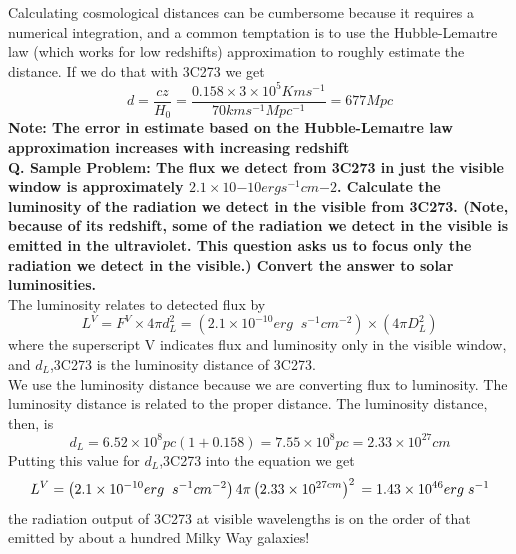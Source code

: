 \documentclass[10pt]{report}
\newcommand{\tbf}[1]{\textbf{#1}}
\newcommand{\cc}[1]{\left({#1}\right)}
\begin{document}
Calculating cosmological distances can be cumbersome because it requires a numerical integration, and a common temptation is to use the Hubble-Lemaıtre law (which works for low redshifts) approximation to roughly estimate the distance. If we do that with 3C273 we get 
\begin{equation}
d=\frac{cz}{H_0}=\frac{0.158 \times 3 \times 10^5 Km s^{-1}}{70 km s^{-1} Mpc^{-1}}=677Mpc
\end{equation}
\tbf{Note: The error in estimate based on the Hubble-Lemaıtre law approximation increases with increasing redshift}\\

\tbf{Q. Sample Problem: The flux we detect from 3C273 in just the visible window is approximately $2.1\times 10{-10} erg s^{-1} cm{-2}$. Calculate the luminosity of the radiation we detect in the visible from 3C273. (Note, because of its redshift, some of the radiation we detect in the visible is emitted in the ultraviolet. This question asks us to focus only the radiation we detect in the visible.) Convert the answer to solar luminosities. }\\

The luminosity relates to detected flux by
\begin{equation}
L^{V}=F^{V}\times 4 \pi d_L^2=\cc{2.1 \times 10^{-10}erg \;\; s^{-1}cm^{-2}}\times\cc{4 \pi D_L^2}
\end{equation}
where the superscript V indicates flux and luminosity only in the visible window, and $d_L$,3C273 is the luminosity distance of 3C273.\\

 We use the luminosity distance because we are converting flux to luminosity. The luminosity distance is related to the proper distance. The luminosity distance, then, is 
 \begin{equation}
 d_L=6.52 \times 10^8 pc\cc{1+0.158}=7.55 \times10^8pc=2.33 \times 10^{27} cm
 \end{equation}
Putting this value for $d_L$,3C273 into the equation we get 
 \begin{equation}
 L^V=\cc{2.1 \times 10^{-10}erg \;\; s^{-1}cm^{-2}}4 \pi \cc{2.33 \times 10^{27cm}}^2\\
 =1.43\times10^{46}erg\;s^{-1} 
 \end{equation}
 the radiation output of 3C273 at visible wavelengths is on the order of that emitted by about a hundred Milky Way galaxies!\\
 
\end{document}
